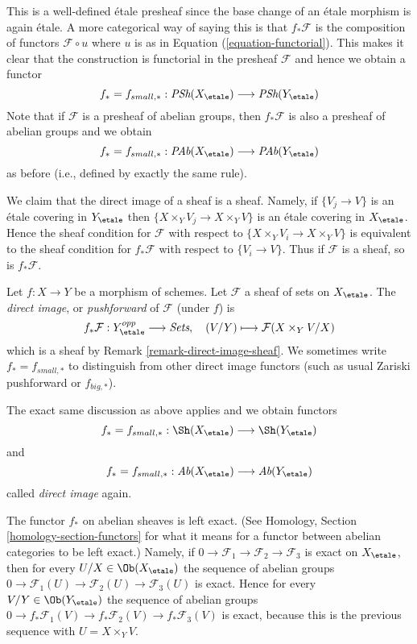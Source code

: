 \noindent
This is a well-defined \'etale presheaf since the base change of an \'etale
morphism is again \'etale. A more categorical way of saying this is that
$f_*\mathcal{F}$ is the composition of functors $\mathcal{F} \circ u$
where $u$ is as in Equation (\ref{equation-functorial}). This makes it
clear that the construction is functorial in the presheaf
$\mathcal{F}$ and hence we obtain a functor
$$
f_* = f_{small, *} :
\textit{PSh}(X_\etale)
\longrightarrow
\textit{PSh}(Y_\etale)
$$
Note that if $\mathcal{F}$ is a presheaf of abelian groups, then
$f_*\mathcal{F}$ is also a presheaf of abelian groups and we obtain
$$
f_* = f_{small, *} :
\textit{PAb}(X_\etale)
\longrightarrow
\textit{PAb}(Y_\etale)
$$
as before (i.e., defined by exactly the same rule).

\begin{remark}
\label{remark-direct-image-sheaf}
We claim that the direct image of a sheaf is a sheaf.
Namely, if $\{V_j \to V\}$ is an \'etale covering in $Y_\etale$
then $\{X \times_Y V_j \to X \times_Y V\}$ is an \'etale covering in
$X_\etale$. Hence the sheaf condition for $\mathcal{F}$ with respect
to $\{X \times_Y V_i \to X \times_Y V\}$
is equivalent to the sheaf condition for $f_*\mathcal{F}$ with respect to
$\{V_i \to V\}$. Thus if $\mathcal{F}$ is a sheaf, so is
$f_*\mathcal{F}$.
\end{remark}

\begin{definition}
\label{definition-direct-image-sheaf}
Let $f: X\to Y$ be a morphism of schemes.
Let $\mathcal{F} $ a sheaf of sets on $X_\etale$.
The {\it direct image}, or {\it pushforward} of $\mathcal{F}$
(under $f$) is
$$
f_*\mathcal{F} : Y_\etale^{opp} \longrightarrow \textit{Sets}, \quad
(V/Y) \longmapsto \mathcal{F}(X \times_Y V/X)
$$
which is a sheaf by
Remark \ref{remark-direct-image-sheaf}.
We sometimes write $f_* = f_{small, *}$ to distinguish from other
direct image functors (such as usual Zariski pushforward or $f_{big, *}$).
\end{definition}

\noindent
The exact same discussion as above applies and we obtain functors
$$
f_* = f_{small, *} :
\Sh(X_\etale)
\longrightarrow
\Sh(Y_\etale)
$$
and
$$
f_* = f_{small, *} :
\textit{Ab}(X_\etale)
\longrightarrow
\textit{Ab}(Y_\etale)
$$
called {\it direct image} again.

\medskip\noindent
The functor $f_*$ on abelian sheaves is left exact. (See
Homology, Section \ref{homology-section-functors}
for what it means for a functor between abelian categories to be left exact.)
Namely, if
$0 \to \mathcal{F}_1 \to \mathcal{F}_2 \to \mathcal{F}_3$
is exact on $X_\etale$, then for every
$U/X \in \Ob(X_\etale)$
the sequence of abelian groups
$0 \to \mathcal{F}_1(U) \to \mathcal{F}_2(U) \to \mathcal{F}_3(U)$
is exact. Hence for every $V/Y \in \Ob(Y_\etale)$
the sequence of abelian groups
$0 \to f_*\mathcal{F}_1(V) \to f_*\mathcal{F}_2(V) \to f_*\mathcal{F}_3(V)$
is exact, because this is the previous sequence with $U = X \times_Y V$.

